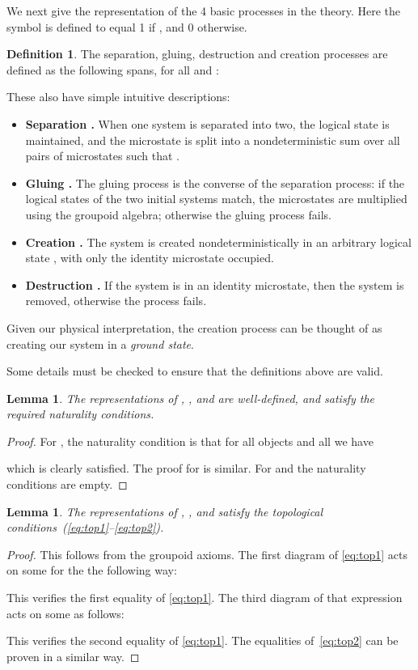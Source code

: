 \documentclass[a4paper,12pt]{article}
\newtheorem{lemma}[theorem]{Lemma}
\theoremstyle{definition}
\newtheorem{defn}[theorem]{Definition}
\renewcommand{\-}[0]{\nobreakdash-\hspace{0pt}}
\begin{document}
We next give the representation of the 4 basic processes in the theory. Here the symbol  is defined to equal 1 if , and 0 otherwise.
\begin{defn}
The separation, gluing, destruction and creation processes are defined as the following spans, for all  and :

\end{defn}

\noindent
These also have simple intuitive descriptions:

\begin{itemize}
\item
{\bf Separation .} When one system is separated into two, the logical state  is maintained, and the microstate  is split into a nondeterministic sum over all pairs of microstates  such that .
\item {\bf Gluing .}
The gluing process is the converse of the separation process: if the logical states of the two initial systems match, the microstates are multiplied using the groupoid algebra; otherwise the gluing process fails.
\item {\bf Creation .}
The system is created nondeterministically in an arbitrary  logical state , with only the identity microstate  occupied.
\item {\bf Destruction .} If the system is in an identity microstate, then the system is removed, otherwise the process fails.
\end{itemize}
Given our physical interpretation, the creation process can be thought of as creating our system in a \textit{ground state}.

Some details must be checked to ensure that the definitions above are valid.
\begin{lemma}
The representations of , ,  and  are well-defined, and satisfy the required naturality conditions.
\end{lemma}
\begin{proof}
For , the naturality condition is that for all objects  and all  we have

which is clearly satisfied. The proof for  is similar. For  and  the naturality conditions are empty.
\end{proof}
\begin{lemma}
The representations of , ,  and  satisfy the topological conditions~(\ref{eq:top1}--\ref{eq:top2}).
\end{lemma}
\begin{proof}
This follows from the groupoid axioms. The first diagram of \eqref{eq:top1} acts on some  for  the the following way:

This verifies the first equality of \eqref{eq:top1}. The third diagram of that expression acts on some  as follows:

This verifies the second
equality of \eqref{eq:top1}. The equalities of~\eqref{eq:top2} can be proven in a similar way.
\end{proof}
\end{document}
